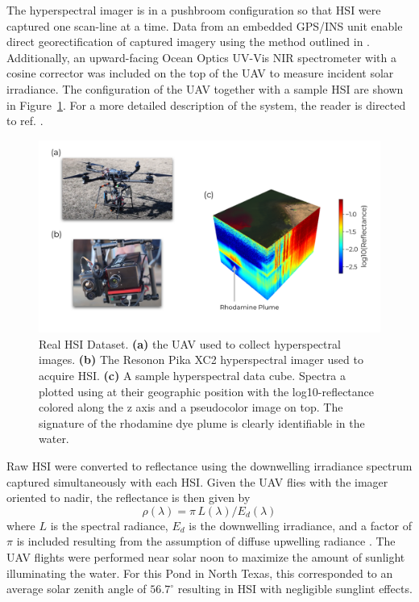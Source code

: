 \documentclass[remotesensing,article,submit,pdftex,moreauthors]{Definitions/mdpi}
\begin{document}
The hyperspectral imager is in a pushbroom configuration so that HSI were captured one scan-line at a time. Data from an embedded GPS/INS unit enable direct georectification of captured imagery using the method outlined in \cite{muller2002program}. Additionally, an upward-facing Ocean Optics UV-Vis NIR spectrometer with a cosine corrector was included on the top of the UAV to measure incident solar irradiance. The configuration of the UAV together with a sample HSI are shown in Figure~\ref{fig:robotteam-data}. For a more detailed description of the system, the reader is directed to ref. \cite{robot-team-1, robot-team-2}.

\begin{figure}[t]
\includegraphics[width=\columnwidth]{methods/robot-team/robot-team-overview.pdf}
\caption{Real HSI Dataset. \textbf{(a)} the UAV used to collect hyperspectral images. \textbf{(b)} The Resonon Pika XC2 hyperspectral imager used to acquire HSI. \textbf{(c)} A sample hyperspectral data cube. Spectra a plotted using at their geographic position with the log10-reflectance colored along the z axis and a pseudocolor image on top. The signature of the rhodamine dye plume is clearly identifiable in the water. \label{fig:robotteam-data}}
\end{figure}  

Raw HSI were converted to reflectance using the downwelling irradiance spectrum captured simultaneously with each HSI. Given the UAV flies with the imager oriented to nadir, the reflectance is then given by 
\begin{equation}
    \rho(\lambda) = \pi\,L(\lambda)/E_d(\lambda)
\end{equation}
where $L$ is the spectral radiance, $E_d$ is the downwelling irradiance, and a factor of $\pi$ is included resulting from the assumption of diffuse upwelling radiance \cite{ruddick2019review}. The UAV flights were performed near solar noon to maximize the amount of sunlight illuminating the water. For this Pond in North Texas, this corresponded to an average solar zenith angle of $56.7^{\circ}$ resulting in HSI with negligible sunglint effects.
\end{document}
